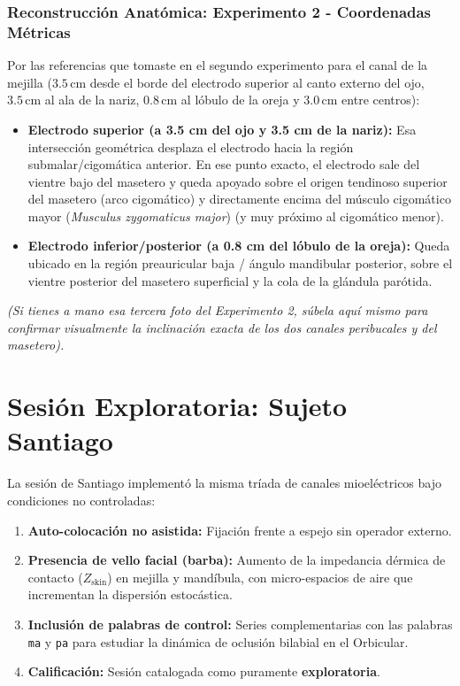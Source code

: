 \documentclass[11pt,a4paper]{article}
\begin{document}
\subsubsection{Reconstrucción Anatómica: Experimento 2 - Coordenadas Métricas}
Por las referencias que tomaste en el segundo experimento para el canal de la mejilla ($3.5\,\text{cm}$ desde el borde del electrodo superior al canto externo del ojo, $3.5\,\text{cm}$ al ala de la nariz, $0.8\,\text{cm}$ al lóbulo de la oreja y $3.0\,\text{cm}$ entre centros):
\begin{itemize}
    \item \textbf{Electrodo superior (a 3.5 cm del ojo y 3.5 cm de la nariz):} Esa intersección geométrica desplaza el electrodo hacia la región submalar/cigomática anterior. En ese punto exacto, el electrodo sale del vientre bajo del masetero y queda apoyado sobre el origen tendinoso superior del masetero (arco cigomático) y directamente encima del músculo cigomático mayor (\textit{Musculus zygomaticus major}) (y muy próximo al cigomático menor).
    \item \textbf{Electrodo inferior/posterior (a 0.8 cm del lóbulo de la oreja):} Queda ubicado en la región preauricular baja / ángulo mandibular posterior, sobre el vientre posterior del masetero superficial y la cola de la glándula parótida.
\end{itemize}
\textit{(Si tienes a mano esa tercera foto del Experimento 2, súbela aquí mismo para confirmar visualmente la inclinación exacta de los dos canales peribucales y del masetero).}

\section{Sesión Exploratoria: Sujeto Santiago}
La sesión de Santiago implementó la misma tríada de canales mioeléctricos bajo condiciones no controladas:
\begin{enumerate}
    \item \textbf{Auto-colocación no asistida:} Fijación frente a espejo sin operador externo.
    \item \textbf{Presencia de vello facial (barba):} Aumento de la impedancia dérmica de contacto ($Z_{\text{skin}}$) en mejilla y mandíbula, con micro-espacios de aire que incrementan la dispersión estocástica.
    \item \textbf{Inclusión de palabras de control:} Series complementarias con las palabras \texttt{ma} y \texttt{pa} para estudiar la dinámica de oclusión bilabial en el Orbicular.
    \item \textbf{Calificación:} Sesión catalogada como puramente \textbf{exploratoria}.
\end{enumerate}
\end{document}
